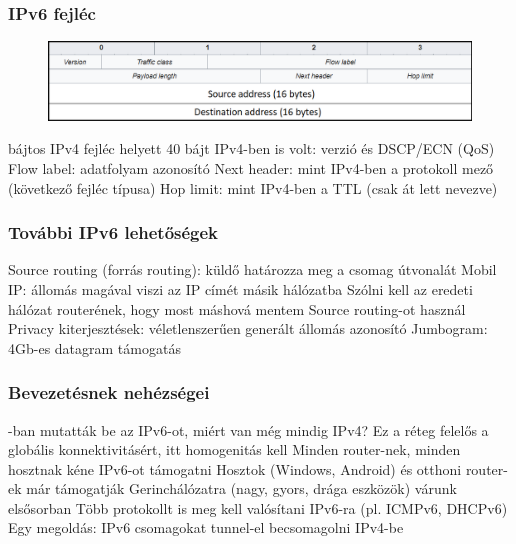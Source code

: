\documentclass[12pt,a4paper]{article}
\begin{document}
\subsubsection{IPv6 fejléc}

\begin{figure}[h!]
	\centering
	\includegraphics[width=1\linewidth]{ipv6-header}
\end{figure}


\begin{outline}
	 bájtos IPv4 fejléc helyett 40 bájt
	\1 IPv4-ben is volt: verzió és DSCP/ECN (QoS)
	\1 Flow label: adatfolyam azonosító
	\1 Next header: mint IPv4-ben a protokoll mező (következő fejléc típusa)
	\1 Hop limit: mint IPv4-ben a TTL (csak át lett nevezve)
\end{outline}

\pagebreak

\subsubsection{További IPv6 lehetőségek}

\begin{outline}
	\1 Source routing (forrás routing): küldő határozza meg a csomag útvonalát
	\1 Mobil IP: állomás magával viszi az IP címét másik hálózatba
		\2 Szólni kell az eredeti hálózat routerének, hogy most máshová mentem
		\2 Source routing-ot használ
	\1 Privacy kiterjesztések: véletlenszerűen generált állomás azonosító
	\1 Jumbogram: 4Gb-es datagram támogatás
\end{outline}

\subsubsection{Bevezetésnek nehézségei}

\begin{outline}
	-ban mutatták be az IPv6-ot, miért van még mindig IPv4?
	\1 Ez a réteg felelős a globális konnektivitásért, itt homogenitás kell
	\1 Minden router-nek, minden hosztnak kéne IPv6-ot támogatni
		\2 Hosztok (Windows, Android) és otthoni router-ek már támogatják
		\2 Gerinchálózatra (nagy, gyors, drága eszközök) várunk elsősorban
	\1 Több protokollt is meg kell valósítani IPv6-ra (pl. ICMPv6, DHCPv6)
	\1 Egy megoldás: IPv6 csomagokat tunnel-el becsomagolni IPv4-be
\end{outline}
\end{document}
